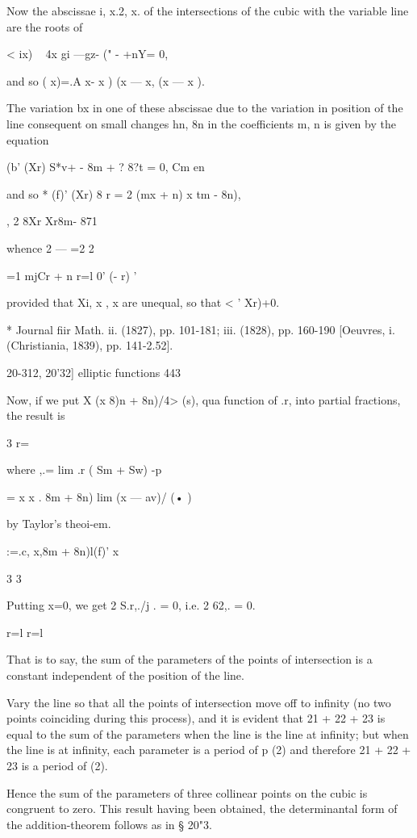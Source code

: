 {Now the abscissae i, x.2, x. of the intersections of the cubic with
the variable line are the roots of

< ix) ~ 4x gi —gz- (" - +nY= 0,

and so ( x)=.A x- x ) (x — x, (x — x ).

The variation bx in one of these abscissae due to the variation in
position of the line consequent on small changes hn, 8n in the
coefficients m, n is given by the equation

(b' (Xr) S*v+ - 8m + ? 8?t = 0, Cm en

and so * (f)' (Xr) 8 r = 2 (mx + n) x tm - 8n),

, 2 8Xr Xr8m- 871

whence 2 — =2 2

=1 mjCr + n r=l 0' (- r) '

provided that Xi, x , x are unequal, so that < ' Xr)+0.

* Journal fiir Math. ii. (1827), pp. 101-181; iii. (1828), pp. 160-190
[Oeuvres, i. (Christiania, 1839), pp. 141-2.52].

20-312, 20'32] elliptic functions 443

Now, if we put X (x 8)n + 8n)/4> (s), qua function of .r, into partial
fractions, the result is

3 r=\

where ,.= lim .r ( Sm + Sw) -p

= x x . 8m + 8n) lim (x — av)/ (• )

by Taylor's theoi-em.

:=.c, x,8m + 8n)l(f)' x \

3 3

Putting x=0, we get 2 S.r,./j . = 0, i.e. 2 62,. = 0.

r=l r=l

That is to say, the sum of the parameters of the points of
intersection is a constant independent of the position of the line.

Vary the line so that all the points of intersection move off to
infinity (no two points coinciding during this process), and it is
evident that 21 + 22 + 23 is equal to the sum of the parameters when
the line is the line at infinity; but when the line is at infinity,
each parameter is a period of p (2) and therefore 21 + 22 + 23 is a
period of (2).

Hence the sum of the parameters of three collinear points on the cubic
is congruent to zero. This result having been obtained, the
determinantal form of the addition-theorem follows as in § 20"3.

}
